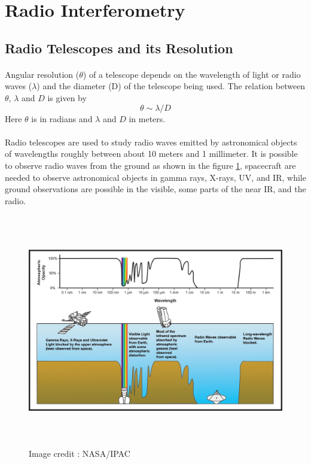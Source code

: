 \section{Radio Interferometry}
\label{s:radio_astronomy}

\subsection{Radio Telescopes and its Resolution}
\label{s:radio_telescope}

\paragraph{}Angular resolution ($\theta$) of a telescope depends on the wavelength of light or 
radio waves ($\lambda$) and the diameter (D) of the telescope being used.
The relation between $\theta$, $\lambda$ and $D$ is given by
\begin{equation}
 \theta \sim  \lambda/D
\label{2.1}
\end{equation}
Here $\theta$ is in radians and $\lambda$ and $D$  in meters.

\paragraph{}Radio telescopes are used to study radio waves emitted by astronomical objects
of wavelengths roughly between about 10 meters and 1 millimeter. It is possible to 
observe radio waves from the ground as shown in the figure \ref{Fignasa}, spacecraft are needed to
observe astronomical objects in gamma rays, X-rays, UV, and IR, while ground observations 
are possible in the visible, some parts of the near IR, and the radio.
\begin{figure}[!htbp]
  \begin{center}
      \includegraphics[width=6.1in,height=4in]{figures/nasa}
    \caption{Image credit : NASA/IPAC}
    \label{Fignasa}
  \end{center}
\end{figure}

